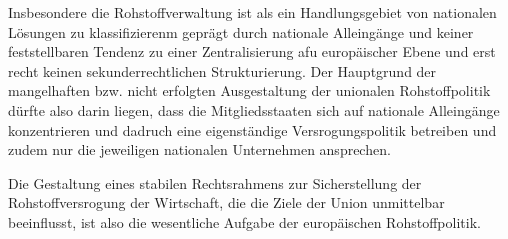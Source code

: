 \documentclass[12pt,a4paper,oneside]{book} %
\begin{document}
	Insbesondere die Rohstoffverwaltung ist als ein Handlungsgebiet von nationalen Lösungen zu klassifizierenm geprägt durch nationale Alleingänge und keiner feststellbaren Tendenz zu einer Zentralisierung afu europäischer Ebene und erst recht keinen sekunderrechtlichen Strukturierung. Der Hauptgrund der mangelhaften bzw. nicht erfolgten Ausgestaltung der unionalen Rohstoffpolitik dürfte also darin liegen, dass die Mitgliedsstaaten sich auf nationale Alleingänge konzentrieren und dadruch eine eigenständige Versrogungspolitik betreiben und zudem nur die jeweiligen nationalen Unternehmen ansprechen.
	
	Die Gestaltung eines stabilen Rechtsrahmens zur Sicherstellung der Rohstoffversrogung der Wirtschaft, die die Ziele der Union unmittelbar beeinflusst, ist also die wesentliche Aufgabe der europäischen Rohstoffpolitik.
	
\end{document}
